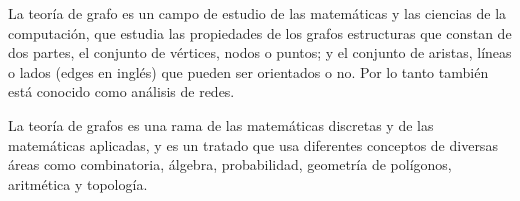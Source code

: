 La teoría de grafo es un campo de estudio de las matemáticas y las ciencias de la computación, que estudia las propiedades de los grafos estructuras que constan de dos partes, el conjunto de vértices, nodos o puntos; y el conjunto de aristas, líneas o lados (edges en inglés) que pueden ser orientados o no. Por lo tanto también está conocido como análisis de redes.

La teoría de grafos es una rama de las matemáticas discretas y de las matemáticas aplicadas, y es un tratado que usa diferentes conceptos de diversas áreas como combinatoria, álgebra, probabilidad, geometría de polígonos, aritmética y topología.
